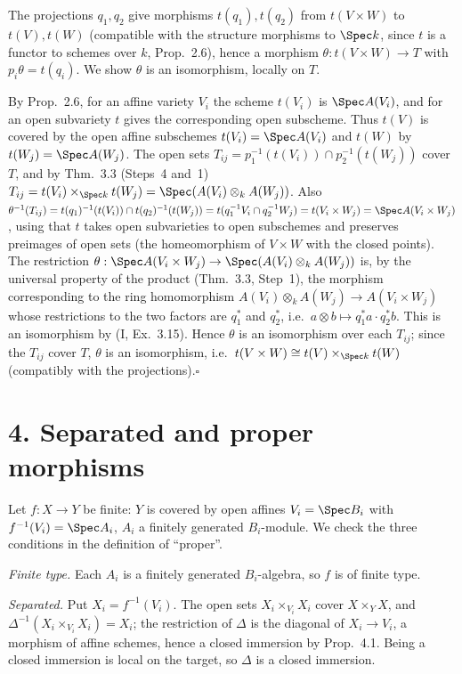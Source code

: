 \documentclass[11pt]{article}
\begin{document}
The projections $q_1,q_2$ give morphisms $t(q_1),t(q_2)$ from $t(V\times W)$ to $t(V),t(W)$ (compatible with the structure morphisms to $\Spec k$, since $t$ is a functor to schemes over $k$, Prop.~2.6), hence a morphism $\theta:t(V\times W)\to T$ with $p_i\theta=t(q_i)$. We show $\theta$ is an isomorphism, locally on $T$.

By Prop.~2.6, for an affine variety $V_i$ the scheme $t(V_i)$ is $\Spec A(V_i)$, and for an open subvariety $t$ gives the corresponding open subscheme. Thus $t(V)$ is covered by the open affine subschemes $t(V_i)=\Spec A(V_i)$ and $t(W)$ by $t(W_j)=\Spec A(W_j)$. The open sets $T_{ij}=p_1^{-1}(t(V_i))\cap p_2^{-1}(t(W_j))$ cover $T$, and by Thm.~3.3 (Steps~4 and~1) $T_{ij}=t(V_i)\times_{\Spec k}t(W_j)=\Spec(A(V_i)\otimes_kA(W_j))$. Also $\theta^{-1}(T_{ij})=t(q_1)^{-1}(t(V_i))\cap t(q_2)^{-1}(t(W_j))=t(q_1^{-1}V_i\cap q_2^{-1}W_j)=t(V_i\times W_j)=\Spec A(V_i\times W_j)$, using that $t$ takes open subvarieties to open subschemes and preserves preimages of open sets (the homeomorphism of $V\times W$ with the closed points). The restriction $\theta:\Spec A(V_i\times W_j)\to\Spec(A(V_i)\otimes_kA(W_j))$ is, by the universal property of the product (Thm.~3.3, Step~1), the morphism corresponding to the ring homomorphism $A(V_i)\otimes_kA(W_j)\to A(V_i\times W_j)$ whose restrictions to the two factors are $q_1^*$ and $q_2^*$, i.e.\ $a\otimes b\mapsto q_1^*a\cdot q_2^*b$. This is an isomorphism by (I, Ex.~3.15). Hence $\theta$ is an isomorphism over each $T_{ij}$; since the $T_{ij}$ cover $T$, $\theta$ is an isomorphism, i.e.\ $t(V\times W)\cong t(V)\times_{\Spec k}t(W)$ (compatibly with the projections).\hfill$\square$

\section*{4. Separated and proper morphisms}

\pf
Let $f:X\to Y$ be finite: $Y$ is covered by open affines $V_i=\Spec B_i$ with $f^{-1}(V_i)=\Spec A_i$, $A_i$ a finitely generated $B_i$-module. We check the three conditions in the definition of ``proper''.

\emph{Finite type.} Each $A_i$ is a finitely generated $B_i$-algebra, so $f$ is of finite type.

\emph{Separated.} Put $X_i=f^{-1}(V_i)$. The open sets $X_i\times_{V_i}X_i$ cover $X\times_YX$, and $\Delta^{-1}(X_i\times_{V_i}X_i)=X_i$; the restriction of $\Delta$ is the diagonal of $X_i\to V_i$, a morphism of affine schemes, hence a closed immersion by Prop.~4.1. Being a closed immersion is local on the target, so $\Delta$ is a closed immersion.
\end{document}

